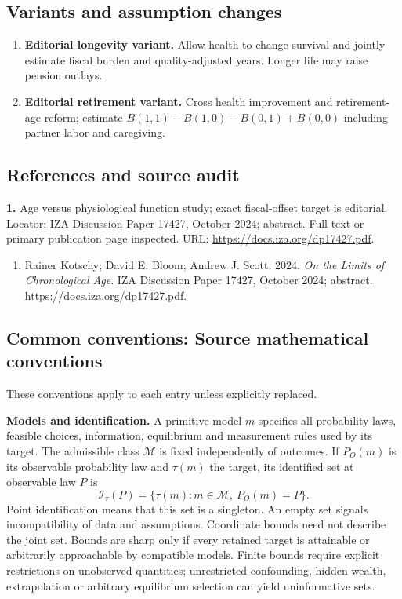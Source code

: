 \documentclass[11pt,a4paper]{article}
\begin{document}
\subsection*{Variants and assumption changes}
\begin{enumerate}
\item \textbf{Editorial longevity variant.} Allow health to change survival and jointly estimate fiscal burden and quality-adjusted years. Longer life may raise pension outlays.
\item \textbf{Editorial retirement variant.} Cross health improvement and retirement-age reform; estimate \(B(1,1)-B(1,0)-B(0,1)+B(0,0)\) including partner labor and caregiving.
\end{enumerate}
\subsection*{References and source audit}
\textbf{1.} Age versus physiological function study; exact fiscal-offset target is editorial. Locator: IZA Discussion Paper 17427, October 2024; abstract. Full text or primary publication page inspected. URL: \url{https://docs.iza.org/dp17427.pdf}.
\begin{enumerate}\raggedright
\item\hypertarget{definitions:source:30007741:1}{} Rainer Kotschy; David E. Bloom; Andrew J. Scott. 2024. \emph{On the Limits of Chronological Age}. IZA Discussion Paper 17427, October 2024; abstract.
\url{https://docs.iza.org/dp17427.pdf}.
\end{enumerate}

\subsection*{Common conventions: Source mathematical conventions}

These conventions apply to each entry unless explicitly replaced.

\textbf{Models and identification.} A primitive model \(m\) specifies all probability laws, feasible choices, information, equilibrium and measurement rules used by its target. The admissible class \(\mathcal M\) is fixed independently of outcomes. If \(P_O(m)\) is its observable probability law and \(\tau(m)\) the target, its identified set at observable law \(P\) is
\[
 \mathcal I_\tau(P)=\{\tau(m):m\in\mathcal M,\ P_O(m)=P\}.
\]
Point identification means that this set is a singleton. An empty set signals incompatibility of data and assumptions. Coordinate bounds need not describe the joint set. Bounds are sharp only if every retained target is attainable or arbitrarily approachable by compatible models. Finite bounds require explicit restrictions on unobserved quantities; unrestricted confounding, hidden wealth, extrapolation or arbitrary equilibrium selection can yield uninformative sets.
\end{document}
